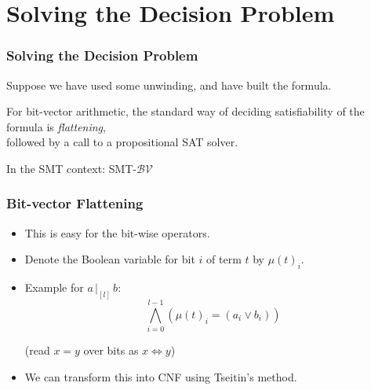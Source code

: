 
\section{Solving the Decision Problem}

\begin{frame}
\frametitle{Solving the Decision Problem}

Suppose we have used some unwinding, and have built the formula.
\vfill

For bit-vector arithmetic, the standard way of deciding satisfiability of
the formula is \emph{flattening},\\
followed by a call to a propositional SAT solver.
\vfill

In the SMT context: SMT-$\mathcal{BV}$

\end{frame}


\begin{frame}

\frametitle{Bit-vector Flattening}

\begin{itemize}

\item This is easy for the bit-wise operators.
\vfill

\item 
Denote the Boolean variable for bit $i$ of term $t$ by \alert{$\mu(t)_i$}.
\vfill

\item Example for $a \,|_{[l]}\, b$:
%
\[ \bigwedge_{i=0}^{l-1} (\mu(t)_i=(a_i\vee b_i)) \]

(read $x=y$ over bits as $x \iff y$)

\pause
\vfill

\item We can transform this into CNF using Tseitin's method.

\end{itemize}

\end{frame}

